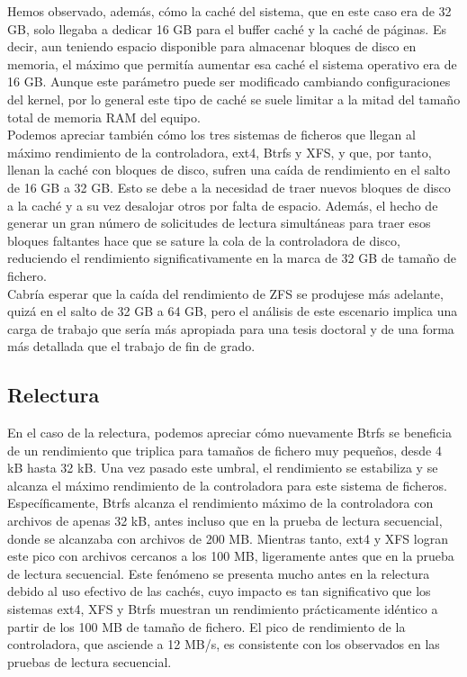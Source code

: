 Hemos observado, además, cómo la caché del sistema, que en este caso era de 32 GB, solo llegaba a dedicar 16 GB para el buffer caché y la caché de páginas. Es decir, aun teniendo espacio disponible para almacenar bloques de disco en memoria, el máximo que permitía aumentar esa caché el sistema operativo era de 16 GB. Aunque este parámetro puede ser modificado cambiando configuraciones del kernel, por lo general este tipo de caché se suele limitar a la mitad del tamaño total de memoria RAM del equipo. \\

Podemos apreciar también cómo los tres sistemas de ficheros que llegan al máximo rendimiento de la controladora, ext4, Btrfs y XFS, y que, por tanto, llenan la caché con bloques de disco, sufren una caída de rendimiento en el salto de 16 GB a 32 GB. Esto se debe a la necesidad de traer nuevos bloques de disco a la caché y a su vez desalojar otros por falta de espacio. Además, el hecho de generar un gran número de solicitudes de lectura simultáneas para traer esos bloques faltantes hace que se sature la cola de la controladora de disco, reduciendo el rendimiento significativamente en la marca de 32 GB de tamaño de fichero. \\

Cabría esperar que la caída del rendimiento de ZFS se produjese más adelante, quizá en el salto de 32 GB a 64 GB, pero el análisis de este escenario implica una carga de trabajo que sería más apropiada para una tesis doctoral y de una forma más detallada que el trabajo de fin de grado.

\subsection{Relectura}

En el caso de la relectura, podemos apreciar cómo nuevamente Btrfs se beneficia de un rendimiento que triplica para tamaños de fichero muy pequeños, desde 4 kB hasta 32 kB. Una vez pasado este umbral, el rendimiento se estabiliza y se alcanza el máximo rendimiento de la controladora para este sistema de ficheros.\\

Específicamente, Btrfs alcanza el rendimiento máximo de la controladora con archivos de apenas 32 kB, antes incluso que en la prueba de lectura secuencial, donde se alcanzaba con archivos de 200 MB. Mientras tanto, ext4 y XFS logran este pico con archivos cercanos a los 100 MB, ligeramente antes que en la prueba de lectura secuencial. Este fenómeno se presenta mucho antes en la relectura debido al uso efectivo de las cachés, cuyo impacto es tan significativo que los sistemas ext4, XFS y Btrfs muestran un rendimiento prácticamente idéntico a partir de los 100 MB de tamaño de fichero. El pico de rendimiento de la controladora, que asciende a 12 MB/s, es consistente con los observados en las pruebas de lectura secuencial.\\

